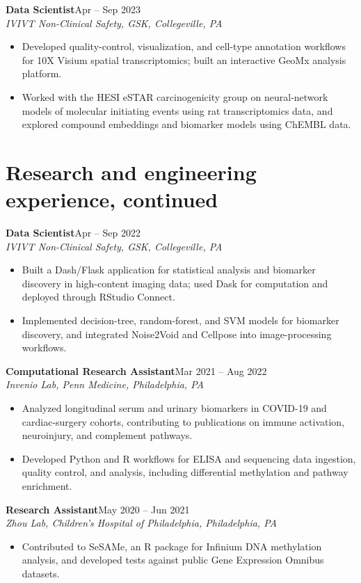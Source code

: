 \documentclass[11pt,letterpaper]{article}
\newcommand{\role}[3]{\textbf{#1}\hfill #2\\\textit{#3}\par}
\begin{document}
\role{Data Scientist}{Apr -- Sep 2023}{IVIVT Non-Clinical Safety, GSK, Collegeville, PA}
\begin{itemize}
\item Developed quality-control, visualization, and cell-type annotation workflows for 10X Visium spatial transcriptomics; built an interactive GeoMx analysis platform.
\item Worked with the HESI eSTAR carcinogenicity group on neural-network models of molecular initiating events using rat transcriptomics data, and explored compound embeddings and biomarker models using ChEMBL data.
\end{itemize}

\newpage
\section{Research and engineering experience, continued}
\role{Data Scientist}{Apr -- Sep 2022}{IVIVT Non-Clinical Safety, GSK, Collegeville, PA}
\begin{itemize}
\item Built a Dash/Flask application for statistical analysis and biomarker discovery in high-content imaging data; used Dask for computation and deployed through RStudio Connect.
\item Implemented decision-tree, random-forest, and SVM models for biomarker discovery, and integrated Noise2Void and Cellpose into image-processing workflows.
\end{itemize}
\role{Computational Research Assistant}{Mar 2021 -- Aug 2022}{Invenio Lab, Penn Medicine, Philadelphia, PA}
\begin{itemize}
\item Analyzed longitudinal serum and urinary biomarkers in COVID-19 and cardiac-surgery cohorts, contributing to publications on immune activation, neuroinjury, and complement pathways.
\item Developed Python and R workflows for ELISA and sequencing data ingestion, quality control, and analysis, including differential methylation and pathway enrichment.
\end{itemize}
\role{Research Assistant}{May 2020 -- Jun 2021}{Zhou Lab, Children's Hospital of Philadelphia, Philadelphia, PA}
\begin{itemize}
\item Contributed to SeSAMe, an R package for Infinium DNA methylation analysis, and developed tests against public Gene Expression Omnibus datasets.
\end{itemize}
\end{document}

